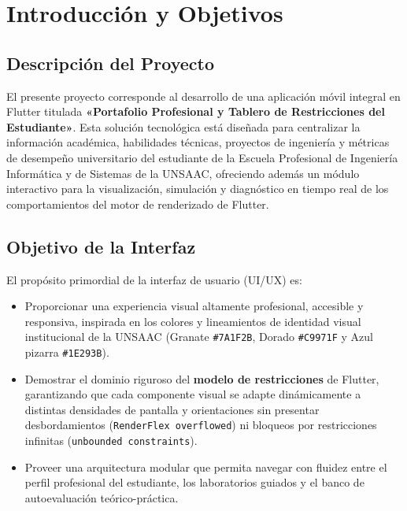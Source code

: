 \documentclass[12pt,a4paper]{article}
\begin{document}
\newpage

\section{Introducción y Objetivos}

\subsection{Descripción del Proyecto}
El presente proyecto corresponde al desarrollo de una aplicación móvil integral en Flutter titulada \textbf{«Portafolio Profesional y Tablero de Restricciones del Estudiante»}. Esta solución tecnológica está diseñada para centralizar la información académica, habilidades técnicas, proyectos de ingeniería y métricas de desempeño universitario del estudiante de la Escuela Profesional de Ingeniería Informática y de Sistemas de la UNSAAC, ofreciendo además un módulo interactivo para la visualización, simulación y diagnóstico en tiempo real de los comportamientos del motor de renderizado de Flutter.

\subsection{Objetivo de la Interfaz}
El propósito primordial de la interfaz de usuario (UI/UX) es:
\begin{itemize}[leftmargin=*]
    \item Proporcionar una experiencia visual altamente profesional, accesible y responsiva, inspirada en los colores y lineamientos de identidad visual institucional de la UNSAAC (Granate \texttt{\#7A1F2B}, Dorado \texttt{\#C9971F} y Azul pizarra \texttt{\#1E293B}).
    \item Demostrar el dominio riguroso del \textbf{modelo de restricciones} de Flutter, garantizando que cada componente visual se adapte dinámicamente a distintas densidades de pantalla y orientaciones sin presentar desbordamientos (\texttt{RenderFlex overflowed}) ni bloqueos por restricciones infinitas (\texttt{unbounded constraints}).
    \item Proveer una arquitectura modular que permita navegar con fluidez entre el perfil profesional del estudiante, los laboratorios guiados y el banco de autoevaluación teórico-práctica.
\end{itemize}
\end{document}
